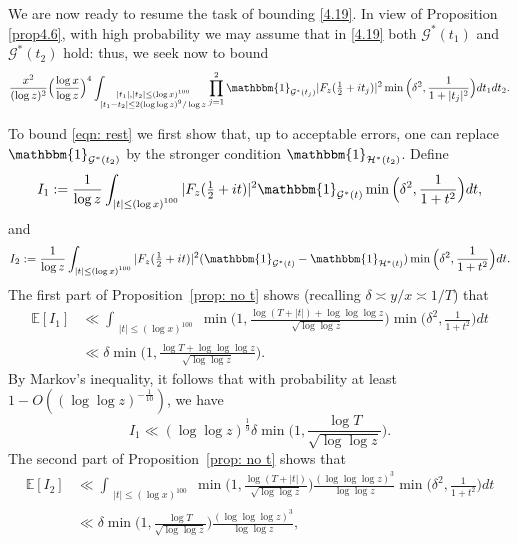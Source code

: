 \documentclass[12pt, notitlepage]{amsart}
\numberwithin{equation}{section}
\def\E{\mathbb E}
\theoremstyle{remark}
\theoremstyle{definition}
\theoremstyle{remark}
\numberwithin{equation}{section}
\begin{document}
We are now ready to resume the task of bounding \eqref{4.19}.   In view of Proposition \ref{prop4.6}, with high probability we may assume that in \eqref{4.19} both ${\mathcal G}^*(t_1)$ and ${\mathcal G}^*(t_2)$ hold: thus, we seek now to bound 
\begin{equation} 
\label{eqn: rest}
 \frac{x^2}{(\log z)^{2}} 
\Big(\frac{\log x}{\log z}\Big)^4 \int_{\substack{|t_1|, |t_2| \le (\log x)^{100}\\ |t_1 -t_2| \le 2 (\log \log z)^9/\log z}} \prod_{j=1}^{2} {\mathbbm{1}_{\mathcal{G}^{*}(t_j)}}
|F_z(\tfrac 12+it_j)|^2  \min\Big(\delta^2,\frac{1}{1+|t_j|^2}\Big) dt_1dt_2. 
\end{equation}

To bound \eqref{eqn: rest}  we first show that, up to acceptable errors, one can replace $\mathbbm{1}_{\mathcal{G}^{*}(t_2)}$ by the stronger condition $\mathbbm{1}_{\mathcal{H}^{*}(t_2)}$. 
Define
\begin{equation}
    I_1: =  \frac{1}{\log z}\int_{\substack{|t| \le (\log x)^{100} }} |F_z(\tfrac 12+it)|^{2} \mathbbm{1}_{\mathcal{G}^{*}(t)} \min\Big(\delta^2, \frac{1}{1+t^2} \Big)dt ,
\end{equation}
and
\begin{equation}
    I_2: = \frac{1}{\log z} \int_{\substack{|t| \le (\log x)^{100} }} |F_z(\tfrac 12+it)|^{2} (\mathbbm{1}_{\mathcal{G}^{*}(t)} - \mathbbm{1}_{\mathcal{H}^{*}(t)}) \min\Big(\delta^2, \frac{1}{1+t^2} \Big) dt.
\end{equation}
The first part of Proposition~\ref{prop: no t} shows (recalling $\delta \asymp y/x \asymp 1/T$) that 
\begin{align*}
\E[I_1] &\ll \int_{\substack{|t| \le (\log x)^{100} }} \min\Big(1, \frac{\log (T+|t|)+\log \log \log z}{\sqrt{\log \log z}}\Big) \min\Big(\delta^2, \frac{1}{1+t^2}\Big) dt \\
&\ll \delta \min\Big(1, \frac{\log T +\log \log \log z}{\sqrt{\log \log z}}\Big). 
\end{align*}
By Markov's inequality, it follows that with probability at least $1-O((\log \log z)^{-\frac 1{10}})$, we have
\begin{equation}
\label{4.25}
 I_1  \ll  (\log \log z)^{\frac 19} \delta \min\Big(1, \frac{\log T}{\sqrt{\log \log z}}\Big). 
\end{equation}
 The second part of Proposition~\ref{prop: no t} shows that 
 \begin{align*}
 \E [I_2] &\ll \int_{\substack{|t| \le (\log x)^{100} }} \min\Big(1, \frac{\log (T+|t|)}{\sqrt{\log \log z}}\Big) \frac{(\log \log \log z)^3}{\log \log z} \min\Big(\delta^2, \frac{1}{1+t^2}\Big) dt 
\\
& \ll \delta \min\Big(1, \frac{\log T}{\sqrt{\log \log z}}\Big) \frac{(\log \log \log z)^3}{\log \log z},
 \end{align*}
\end{document}
